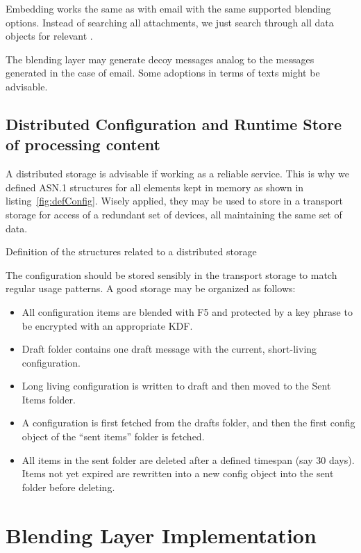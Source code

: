 Embedding works the same as with email with the same supported blending options. Instead of searching all attachments, we just search through all data objects for relevant \VortexMessages.

The blending layer may generate decoy messages analog to the messages generated in the case of email. Some adoptions in terms of texts might be advisable.

\section{Distributed Configuration and Runtime Store of processing content}
A distributed storage is advisable if working as a reliable service. This is why we defined ASN.1 structures for all elements kept in memory as shown in listing~\ref{fig:defConfig}. Wisely applied, they may be used to store in a transport storage for access of a redundant set of devices, all maintaining the same set of data. 

\begin{lstfloat}[ht]
	
	\caption{Definition of the structures related to a distributed storage}
	\label{fig:defConfig}
\end{lstfloat}

The configuration should be stored sensibly in the transport storage to match regular usage patterns. A good storage may be organized as follows:
\begin{itemize}
	\item All configuration items are blended with F5 and protected by a key phrase to be encrypted with an appropriate KDF.
	\item Draft folder contains one draft message with the current, short-living configuration. 
	\item Long living configuration is written to draft and then moved to the Sent Items folder.
	\item A configuration is first fetched from the drafts folder, and then the first config object of the ``sent items'' folder is fetched.
	\item All items in the sent folder are deleted after a defined timespan (say 30 days). Items not yet expired are rewritten into a new config object into the sent folder before deleting. 
\end{itemize}


\chapter{Blending Layer Implementation}\label{sec:blendingImplementation}
